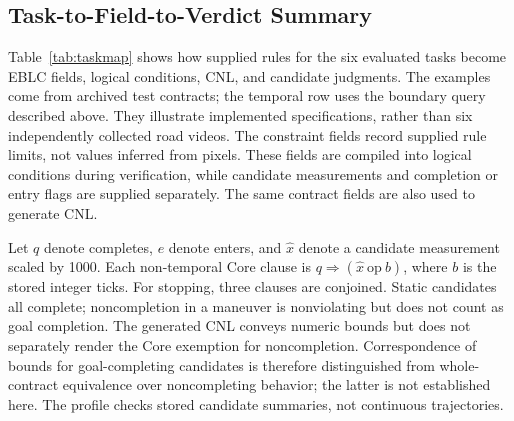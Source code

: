 \documentclass[nolineno]{ieeeaccess}
\begin{document}
\subsection{Task-to-Field-to-Verdict Summary}

Table~\ref{tab:taskmap} shows how supplied rules for the six evaluated tasks become EBLC fields, logical conditions, CNL, and candidate judgments. The examples come from archived test contracts; the temporal row uses the boundary query described above. They illustrate implemented specifications, rather than six independently collected road videos. The constraint fields record supplied rule limits, not values inferred from pixels. These fields are compiled into logical conditions during verification, while candidate measurements and completion or entry flags are supplied separately. The same contract fields are also used to generate CNL.\par

Let $q$ denote {\ttfamily{}\selectfont\footnotesize completes}, $e$ denote {\ttfamily{}\selectfont\footnotesize enters}, and $\widehat{x}$ denote a candidate measurement scaled by 1000. Each non-temporal Core clause is $q\Rightarrow(\widehat{x}\ \mathrm{op}\ b)$, where $b$ is the stored integer {\ttfamily{}\selectfont\footnotesize ticks}. For stopping, three clauses are conjoined. Static candidates all complete; noncompletion in a maneuver is nonviolating but does not count as goal completion. The generated CNL conveys numeric bounds but does not separately render the Core exemption for noncompletion. Correspondence of bounds for goal-completing candidates is therefore distinguished from whole-contract equivalence over noncompleting behavior; the latter is not established here. The profile checks stored candidate summaries, not continuous trajectories.\par
\end{document}
